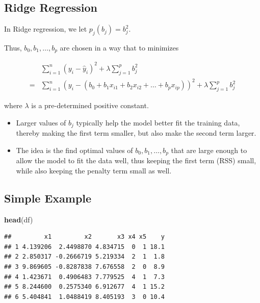\documentclass[]{book}
\newenvironment{Shaded}{\begin{snugshade}}{\end{snugshade}}
\newcommand{\KeywordTok}[1]{\textcolor[rgb]{0.13,0.29,0.53}{\textbf{#1}}}
\newcommand{\NormalTok}[1]{#1}
\begin{document}
\subsection{Ridge Regression}\label{ridge-regression}

In Ridge regression, we let \(p_j(b_j) = b_j^2\).

Thus, \(b_0, b_1, \ldots, b_p\) are chosen in a way that to minimizes

\[
\begin{aligned}
& \displaystyle\sum_{i=1}^n (y_i -\hat{y}_i)^2  + \lambda\displaystyle\sum_{j=1}^pb_j^2\\ =  & \displaystyle\sum_{i=1}^n (y_i -(b_0 + b_1x_{i1} + b_2x_{i2} + \ldots + b_px_{ip}))^2 + \lambda\displaystyle\sum_{j=1}^pb_j^2
\end{aligned}
\]

where \(\lambda\) is a pre-determined positive constant.

\begin{itemize}
\item
  Larger values of \(b_j\) typically help the model better fit the
  training data, thereby making the first term smaller, but also make
  the second term larger.
\item
  The idea is the find optimal values of \(b_0, b_1, \ldots, b_p\) that
  are large enough to allow the model to fit the data well, thus keeping
  the first term (RSS) small, while also keeping the penalty term small
  as well.
\end{itemize}

\subsection{Simple Example}\label{simple-example}

\begin{Shaded}
\begin{Highlighting}[]
\KeywordTok{head}\NormalTok{(df)}
\end{Highlighting}
\end{Shaded}

\begin{verbatim}
##         x1         x2       x3 x4 x5    y
## 1 4.139206  2.4498870 4.834715  0  1 18.1
## 2 2.850317 -0.2666719 5.219334  2  1  1.8
## 3 9.869605 -0.8287838 7.676558  2  0  8.9
## 4 1.423671  0.4906483 7.779525  4  1  7.3
## 5 8.244600  0.2575340 6.912677  4  1 15.2
## 6 5.404841  1.0488419 8.405193  3  0 10.4
\end{verbatim}
\end{document}

